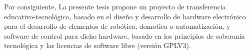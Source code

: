 Por consiguiente, La presente tesis propone un proyecto de transferencia educativo-tecnológico, basado en el diseño y desarrollo de hardware electrónico para el desarrollo de elementos de robótica, domotica o automatización, y software de control para dicho hardware, basado en los principios de soberanía tecnológica y las licencias de software libre (versión GPLV3).
